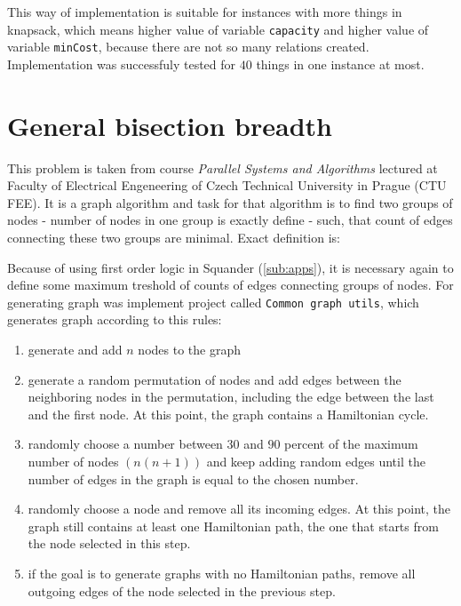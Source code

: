 \documentclass[11pt,twoside,a4paper]{book}
\begin{document}
This way of implementation is suitable for instances with more things in
knapsack, which means higher value of variable \verb|capacity| and higher value
of variable \verb|minCost|, because there are not so many relations created.
Implementation was successfuly tested for $40$ things in one instance at most.

\section{General bisection breadth}

\label{sec:gbb}
This problem is taken from course \textit{Parallel Systems and Algorithms}
lectured at Faculty of Electrical Engeneering of Czech Technical University in
Prague (CTU FEE). It is a graph algorithm and task for that algorithm is to find
two groups of nodes - number of nodes in one group is exactly define - such, that
count of edges connecting these two groups are minimal. Exact definition is:

\begin{center}
\end{center}

Because of using first order logic in Squander (\ref{sub:apps}), it is necessary
again to define some maximum treshold of counts of edges connecting groups of nodes. For generating
graph was implement project called \verb|Common graph utils|, which generates
graph according to this rules:

\begin{enumerate}
  \item generate and add $n$ nodes to the graph
  \item generate a random permutation of nodes and add edges between the neighboring
nodes in the permutation, including the edge between the last and the first
node. At this point, the graph contains a Hamiltonian cycle.
  \item randomly choose a number between $30$ and $90$ percent of the maximum
  number of nodes $(n(n + 1))$ and keep adding random edges until the number of
  edges in the graph is equal to the chosen number.
  \item randomly choose a node and remove all its incoming edges. At this point, the
graph still contains at least one Hamiltonian path, the one that starts from the
node selected in this step.
\item if the goal is to generate graphs with no Hamiltonian paths, remove all outgoing
edges of the node selected in the previous step.
\end{enumerate}
\end{document}
